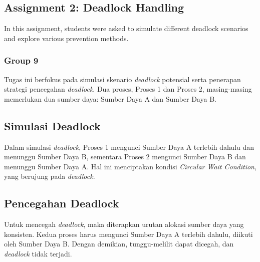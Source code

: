 \documentclass[12pt]{article}
\begin{document}
\subsection{Assignment 2: Deadlock Handling}
	In this assignment, students were asked to simulate different deadlock scenarios and explore various prevention methods.

\subsubsection{Group 9}

Tugas ini berfokus pada simulasi skenario \textit{deadlock} potensial serta penerapan strategi pencegahan \textit{deadlock}. Dua proses, Proses 1 dan Proses 2, masing-masing memerlukan dua sumber daya: Sumber Daya A dan Sumber Daya B.

\subsection*{Simulasi Deadlock}

Dalam simulasi \textit{deadlock}, Proses 1 mengunci Sumber Daya A terlebih dahulu dan menunggu Sumber Daya B, sementara Proses 2 mengunci Sumber Daya B dan menunggu Sumber Daya A. Hal ini menciptakan kondisi \textit{Circular Wait Condition}, yang berujung pada \textit{deadlock}.

\subsection*{Pencegahan Deadlock}

Untuk mencegah \textit{deadlock}, maka diterapkan urutan alokasi sumber daya yang konsisten. Kedua proses harus mengunci Sumber Daya A terlebih dahulu, diikuti oleh Sumber Daya B. Dengan demikian, tunggu-melilit dapat dicegah, dan \textit{deadlock} tidak terjadi.
\vspace{10pt}

\end{document}
